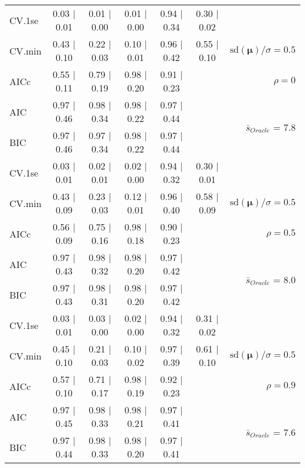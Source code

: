 \begin{table}
\begin{center}
\begin{tabular}{l*{5}{c}|r}
 \hline 
CV.1se & 0.03 $\mid$ 0.01 & 0.01 $\mid$ 0.00 & 0.01 $\mid$ 0.00 & 0.94 $\mid$ 0.34 & 0.30 $\mid$ 0.02 & \\
CV.min & 0.43 $\mid$ 0.10 & 0.22 $\mid$ 0.03 & 0.10 $\mid$ 0.01 & 0.96 $\mid$ 0.42 & 0.55 $\mid$ 0.10 &  $\mathrm{sd}(\mathbf{\mu})/\sigma=0.5$ \\
AICc & 0.55 $\mid$ 0.11 & 0.79 $\mid$ 0.19 & 0.98 $\mid$ 0.20 & 0.91 $\mid$ 0.23 & & $\rho=0$ \\
AIC & 0.97 $\mid$ 0.46 & 0.98 $\mid$ 0.34 & 0.98 $\mid$ 0.22 & 0.97 $\mid$ 0.44 & &  \multirow{2}{*}{$\bar{s}_{Oracle}$ = 7.8} \\
BIC & 0.97 $\mid$ 0.46 & 0.97 $\mid$ 0.34 & 0.98 $\mid$ 0.22 & 0.97 $\mid$ 0.44 & &  \\
 \hline 
CV.1se & 0.03 $\mid$ 0.01 & 0.02 $\mid$ 0.01 & 0.02 $\mid$ 0.00 & 0.94 $\mid$ 0.32 & 0.30 $\mid$ 0.01 & \\
CV.min & 0.43 $\mid$ 0.09 & 0.23 $\mid$ 0.03 & 0.12 $\mid$ 0.01 & 0.96 $\mid$ 0.40 & 0.58 $\mid$ 0.09 &  $\mathrm{sd}(\mathbf{\mu})/\sigma=0.5$ \\
AICc & 0.56 $\mid$ 0.09 & 0.75 $\mid$ 0.16 & 0.98 $\mid$ 0.18 & 0.90 $\mid$ 0.23 & & $\rho=0.5$ \\
AIC & 0.97 $\mid$ 0.43 & 0.98 $\mid$ 0.32 & 0.98 $\mid$ 0.20 & 0.97 $\mid$ 0.42 & &  \multirow{2}{*}{$\bar{s}_{Oracle}$ = 8.0} \\
BIC & 0.97 $\mid$ 0.43 & 0.98 $\mid$ 0.31 & 0.98 $\mid$ 0.20 & 0.97 $\mid$ 0.42 & &  \\
 \hline 
CV.1se & 0.03 $\mid$ 0.01 & 0.03 $\mid$ 0.00 & 0.02 $\mid$ 0.00 & 0.94 $\mid$ 0.32 & 0.31 $\mid$ 0.02 & \\
CV.min & 0.45 $\mid$ 0.10 & 0.21 $\mid$ 0.03 & 0.10 $\mid$ 0.02 & 0.97 $\mid$ 0.39 & 0.61 $\mid$ 0.10 &  $\mathrm{sd}(\mathbf{\mu})/\sigma=0.5$ \\
AICc & 0.57 $\mid$ 0.10 & 0.71 $\mid$ 0.17 & 0.98 $\mid$ 0.19 & 0.92 $\mid$ 0.23 & & $\rho=0.9$ \\
AIC & 0.97 $\mid$ 0.45 & 0.98 $\mid$ 0.33 & 0.98 $\mid$ 0.21 & 0.97 $\mid$ 0.41 & &  \multirow{2}{*}{$\bar{s}_{Oracle}$ = 7.6} \\
BIC & 0.97 $\mid$ 0.44 & 0.98 $\mid$ 0.33 & 0.98 $\mid$ 0.20 & 0.97 $\mid$ 0.41 & &  \\
 \hline 
\end{tabular}
\end{center}
\vspace{-1cm}
\end{table}




